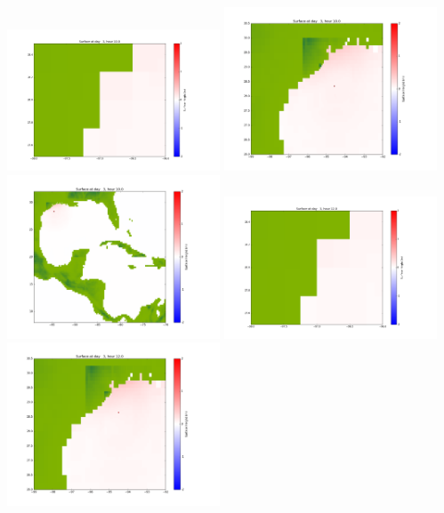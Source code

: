 \documentclass[11pt]{article}
\begin{document}
\vskip 10pt 
\includegraphics[width=0.475\textwidth]{frame0065fig1001.png}
\includegraphics[width=0.475\textwidth]{frame0065fig1002.png}
\vskip 10pt 
\includegraphics[width=0.475\textwidth]{frame0065fig1003.png}
\vskip 10pt 
\includegraphics[width=0.475\textwidth]{frame0066fig1001.png}
\includegraphics[width=0.475\textwidth]{frame0066fig1002.png}
\end{document}
